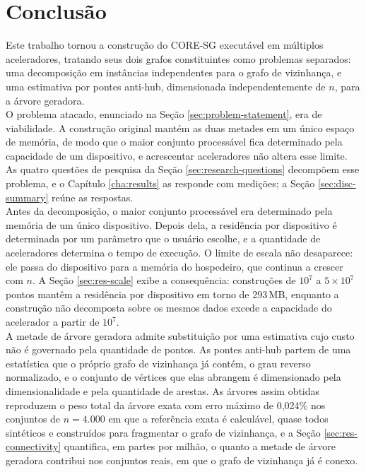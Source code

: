 
\chapter{Conclusão\label{cha:conclusion}}

Este trabalho tornou a construção do \ac{CORE-SG} executável em múltiplos aceleradores, tratando seus dois grafos constituintes como problemas separados: uma decomposição em instâncias independentes para o grafo de vizinhança, e uma estimativa por pontes anti-hub, dimensionada independentemente de $n$, para a árvore geradora.\\

O problema atacado, enunciado na Seção \ref{sec:problem-statement}, era de viabilidade. A construção original mantém as duas metades em um único espaço de memória, de modo que o maior conjunto processável fica determinado pela capacidade de um dispositivo, e acrescentar aceleradores não altera esse limite. As quatro questões de pesquisa da Seção \ref{sec:research-questions} decompõem esse problema, e o Capítulo \ref{cha:results} as responde com medições; a Seção \ref{sec:disc-summary} reúne as respostas.\\

Antes da decomposição, o maior conjunto processável era determinado pela memória de um único dispositivo. Depois dela, a residência por dispositivo é determinada por um parâmetro que o usuário escolhe, e a quantidade de aceleradores determina o tempo de execução. O limite de escala não desaparece: ele passa do dispositivo para a memória do hospedeiro, que continua a crescer com $n$. A Seção \ref{sec:res-scale} exibe a consequência: construções de $10^7$ a $5 \times 10^7$ pontos mantêm a residência por dispositivo em torno de 293\,MB, enquanto a construção não decomposta sobre os mesmos dados excede a capacidade do acelerador a partir de $10^7$.\\

A metade de árvore geradora admite substituição por uma estimativa cujo custo não é governado pela quantidade de pontos. As pontes anti-hub partem de uma estatística que o próprio grafo de vizinhança já contém, o grau reverso normalizado, e o conjunto de vértices que elas abrangem é dimensionado pela dimensionalidade e pela quantidade de arestas. As árvores assim obtidas reproduzem o peso total da árvore exata com erro máximo de 0,024\% nos conjuntos de $n = 4.000$ em que a referência exata é calculável, quase todos sintéticos e construídos para fragmentar o grafo de vizinhança, e a Seção \ref{sec:res-connectivity} quantifica, em partes por milhão, o quanto a metade de árvore geradora contribui nos conjuntos reais, em que o grafo de vizinhança já é conexo.\\

